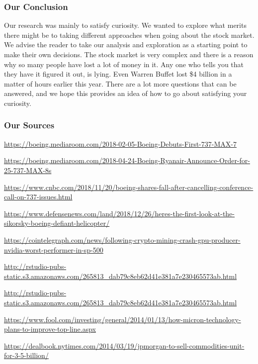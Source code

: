 \documentclass[]{article}
\begin{document}
\hypertarget{our-conclusion}{%
\subsubsection{\texorpdfstring{\textbf{Our
Conclusion}}{Our Conclusion}}\label{our-conclusion}}

Our research was mainly to satisfy curiosity. We wanted to explore what
merits there might be to taking different approaches when going about
the stock market. We advise the reader to take our analysis and
exploration as a starting point to make their own decisions. The stock
market is very complex and there is a reason why so many people have
lost a lot of money in it. Any one who tells you that they have it
figured it out, is lying. Even Warren Buffet lost \$4 billion in a
matter of hours earlier this year. There are a lot more questions that
can be answered, and we hope this provides an idea of how to go about
satisfying your curiosity.

\hypertarget{our-sources}{%
\subsubsection{\texorpdfstring{\textbf{Our
Sources}}{Our Sources}}\label{our-sources}}

\url{https://boeing.mediaroom.com/2018-02-05-Boeing-Debuts-First-737-MAX-7}

\url{https://boeing.mediaroom.com/2018-04-24-Boeing-Ryanair-Announce-Order-for-25-737-MAX-8s}

\url{https://www.cnbc.com/2018/11/20/boeing-shares-fall-after-cancelling-conference-call-on-737-issues.html}

\url{https://www.defensenews.com/land/2018/12/26/heres-the-first-look-at-the-sikorsky-boeing-defiant-helicopter/}

\url{https://cointelegraph.com/news/following-crypto-mining-crash-gpu-producer-nvidia-worst-performer-in-sp-500}

\url{http://rstudio-pubs-static.s3.amazonaws.com/265813_dab79c8eb62d41e381a7e230465573ab.html}

\url{http://rstudio-pubs-static.s3.amazonaws.com/265813_dab79c8eb62d41e381a7e230465573ab.html}

\url{https://www.fool.com/investing/general/2014/01/13/how-micron-technology-plans-to-improve-top-line.aspx}

\url{https://dealbook.nytimes.com/2014/03/19/jpmorgan-to-sell-commodities-unit-for-3-5-billion/}
\end{document}
